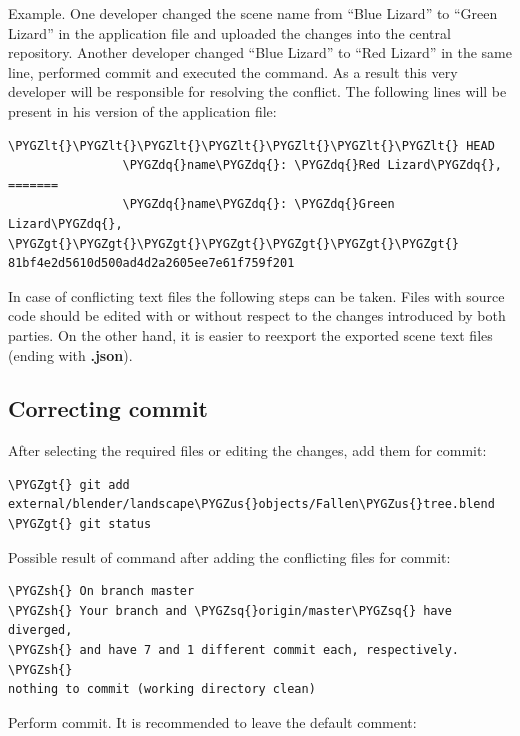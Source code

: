 \documentclass[a4paper,12pt,oneside]{sphinxmanual}
\def\PYGZus{\char`\_}
\def\PYGZlt{\char`\<}
\def\PYGZgt{\char`\>}
\def\PYGZsh{\char`\#}
\def\PYGZsq{\char`\'}
\def\PYGZdq{\char`\"}
\begin{document}
Example. One developer changed the scene name from ``Blue Lizard'' to ``Green Lizard'' in the application file and uploaded the changes into the central repository. Another developer changed ``Blue Lizard'' to ``Red Lizard'' in the same line, performed commit and executed the  command. As a result this very developer will be responsible for resolving the conflict. The following lines will be present in his version of the application file:

\begin{Verbatim}[commandchars=\\\{\}]
\PYGZlt{}\PYGZlt{}\PYGZlt{}\PYGZlt{}\PYGZlt{}\PYGZlt{}\PYGZlt{} HEAD
                \PYGZdq{}name\PYGZdq{}: \PYGZdq{}Red Lizard\PYGZdq{},
=======
                \PYGZdq{}name\PYGZdq{}: \PYGZdq{}Green Lizard\PYGZdq{},
\PYGZgt{}\PYGZgt{}\PYGZgt{}\PYGZgt{}\PYGZgt{}\PYGZgt{}\PYGZgt{} 81bf4e2d5610d500ad4d2a2605ee7e61f759f201
\end{Verbatim}

In case of conflicting text files the following steps can be taken. Files with source code should be edited with or without respect to the changes introduced by both parties. On the other hand, it is easier to reexport the exported scene text files (ending with \textbf{.json}).


\subsection{Correcting commit}
\label{git_short_manual:id21}
After selecting the required files or editing the changes, add them for commit:

\begin{Verbatim}[commandchars=\\\{\}]
\PYGZgt{} git add external/blender/landscape\PYGZus{}objects/Fallen\PYGZus{}tree.blend
\PYGZgt{} git status
\end{Verbatim}

Possible result of  command after adding the conflicting files for commit:

\begin{Verbatim}[commandchars=\\\{\}]
\PYGZsh{} On branch master
\PYGZsh{} Your branch and \PYGZsq{}origin/master\PYGZsq{} have diverged,
\PYGZsh{} and have 7 and 1 different commit each, respectively.
\PYGZsh{}
nothing to commit (working directory clean)
\end{Verbatim}

Perform commit. It is recommended to leave the default comment:
\end{document}
